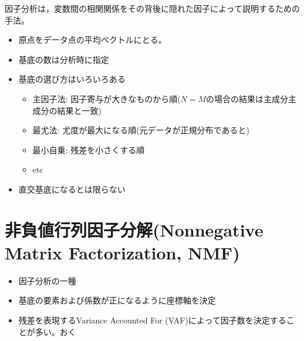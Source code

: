 \documentclass[a4paper,11pt]{jsarticle}
\begin{document}
因子分析は，変数間の相関関係をその背後に隠れた因子によって説明するための手法。

\begin{itemize}
  \item 原点をデータ点の平均ベクトルにとる。
  \item 基底の数は分析時に指定
  \item 基底の選び方はいろいろある
  \begin{itemize}
    \item 主因子法: 因子寄与が大きなものから順($N=M$の場合の結果は主成分主成分の結果と一致)
    \item 最尤法: 尤度が最大になる順(元データが正規分布であると)
    \item 最小自乗: 残差を小さくする順
    \item etc
  \end{itemize}
    \item 直交基底になるとは限らない
    \end{itemize}
  
\section{非負値行列因子分解(Nonnegative Matrix Factorization, NMF)}

\begin{itemize}
  \item 因子分析の一種
  \item 基底の要素および係数が正になるように座標軸を決定
  \item 残差を表現するVariance Accounted For (VAF)によって因子数を決定することが多い。おく
\end{itemize}
\end{document}
